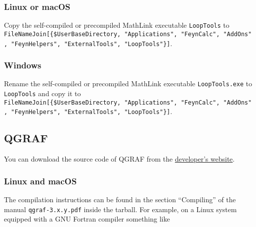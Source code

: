 \documentclass[../FeynHelpersManual.tex]{subfiles}
\begin{document}
\hypertarget{linux-or-macos-1}{%
\subsubsection{Linux or macOS}\label{linux-or-macos-1}}

Copy the self-compiled or precompiled MathLink executable
\texttt{LoopTools} to
\texttt{FileNameJoin[\allowbreak{}\{\allowbreak{}\$UserBaseDirectory,\ \allowbreak{}"Applications",\ \allowbreak{}"FeynCalc",\ \allowbreak{}"AddOns",\ \allowbreak{}"FeynHelpers",\ \allowbreak{}"ExternalTools",\ \allowbreak{}"LoopTools"\}]}.

\hypertarget{windows-4}{%
\subsubsection{Windows}\label{windows-4}}

Rename the self-compiled or precompiled MathLink executable
\texttt{LoopTools.exe} to \texttt{LoopTools} and copy it to
\texttt{FileNameJoin[\allowbreak{}\{\allowbreak{}\$UserBaseDirectory,\ \allowbreak{}"Applications",\ \allowbreak{}"FeynCalc",\ \allowbreak{}"AddOns",\ \allowbreak{}"FeynHelpers",\ \allowbreak{}"ExternalTools",\ \allowbreak{}"LoopTools"\}]}.

\hypertarget{qgraf}{%
\subsection{QGRAF}\label{qgraf}}

You can download the source code of QGRAF from the
\href{http://cfif.ist.utl.pt/~paulo/qgraf.html}{developer's website}.

\hypertarget{linux-and-macos-1}{%
\subsubsection{Linux and macOS}\label{linux-and-macos-1}}

The compilation instructions can be found in the section ``Compiling''
of the manual \texttt{qgraf-3.x.y.pdf} inside the tarball. For example,
on a Linux system equipped with a GNU Fortran compiler something like

\begin{Shaded}
\begin{Highlighting}[]
\SpecialCharTok{{-}}
\end{Highlighting}
\end{Shaded}
\end{document}
